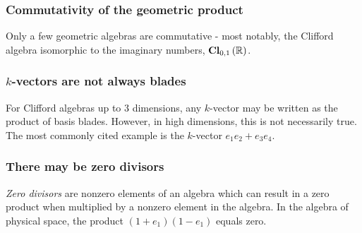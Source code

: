 \subsubsection{Commutativity of the geometric product}

Only a few geometric algebras are commutative - most notably, the Clifford algebra isomorphic to the
imaginary numbers, $\operatorname{\mathbf{Cl}}_{0,1}\left(\mathbb{R}\right)$.

\subsubsection{$k$-vectors are not always blades}

For Clifford algebras up to 3 dimensions, any $k$-vector may be written as the product of basis
blades. However, in high dimensions, this is not necessarily true. The most commonly cited example
is the $k$-vector $e_1 e_2 + e_3 e_4$. 

\subsubsection{There may be zero divisors}

\textit{Zero divisors} are nonzero elements of an algebra which can result in a zero product when
multiplied by a nonzero element in the algebra. In the algebra of physical space, the product
$(1 + e_1)(1 - e_1)$ equals zero.
